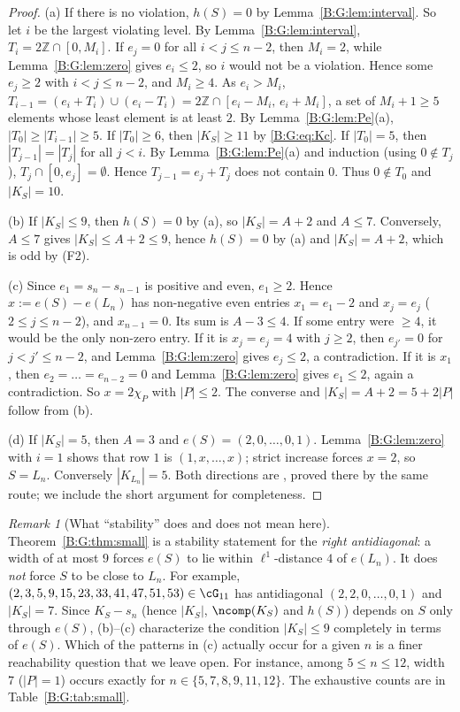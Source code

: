 \documentclass[11pt,a4paper]{article}
\theoremstyle{definition}
\theoremstyle{remark}
\newtheorem{remark}[theorem]{Remark}
\numberwithin{equation}{section}
\begin{document}
\begin{proof}
(a) If there is no violation, $h(S)=0$ by Lemma~\ref{B:G:lem:interval}. So let $i$ be the largest
violating level. By Lemma~\ref{B:G:lem:interval}, $T_i=2\mathbb{Z}\cap[0,M_i]$. If $e_j=0$ for all
$i<j\le n-2$, then $M_i=2$, while Lemma~\ref{B:G:lem:zero} gives $e_i\le2$, so $i$ would not be a
violation. Hence some $e_j\ge2$ with $i<j\le n-2$, and $M_i\ge4$. As $e_i>M_i$,
$T_{i-1}=(e_i+T_i)\cup(e_i-T_i)=2\mathbb{Z}\cap[e_i-M_i,\,e_i+M_i]$, a set of $M_i+1\ge5$ elements
whose least element is at least $2$. By Lemma~\ref{B:G:lem:Pe}(a), $|T_0|\ge|T_{i-1}|\ge5$. If
$|T_0|\ge6$, then $|K_S|\ge11$ by \eqref{B:G:eq:Kc}. If $|T_0|=5$, then $|T_{j-1}|=|T_j|$ for all
$j<i$. By Lemma~\ref{B:G:lem:Pe}(a) and induction (using $0\notin T_j$), $T_j\cap[0,e_j]=\emptyset$.
Hence $T_{j-1}=e_j+T_j$ does not contain $0$. Thus $0\notin T_0$ and $|K_S|=10$.

(b) If $|K_S|\le9$, then $h(S)=0$ by (a), so $|K_S|=A+2$ and $A\le7$. Conversely, $A\le7$ gives
$|K_S|\le A+2\le9$, hence $h(S)=0$ by (a) and $|K_S|=A+2$, which is odd by (F2).

(c) Since $e_1=s_n-s_{n-1}$ is positive and even, $e_1\ge2$. Hence $x:=e(S)-e(L_n)$ has
non-negative even entries $x_1=e_1-2$ and $x_j=e_j$ ($2\le j\le n-2$), and $x_{n-1}=0$. Its sum is
$A-3\le4$. If some entry were $\ge4$, it would be the only non-zero entry. If it is $x_j=e_j=4$
with $j\ge2$, then $e_{j'}=0$ for $j<j'\le n-2$, and Lemma~\ref{B:G:lem:zero} gives $e_j\le2$, a
contradiction. If it is $x_1$, then $e_2=\dots=e_{n-2}=0$ and Lemma~\ref{B:G:lem:zero} gives $e_1\le2$,
again a contradiction. So $x=2\chi_P$ with $|P|\le2$. The converse and $|K_S|=A+2=5+2|P|$ follow
from (b).

(d) If $|K_S|=5$, then $A=3$ and $e(S)=(2,0,\dots,0,1)$. Lemma~\ref{B:G:lem:zero} with $i=1$ shows
that row $1$ is $(1,x,\dots,x)$; strict increase forces $x=2$, so $S=L_n$. Conversely
$|K_{L_n}|=5$. Both directions are \cite[Thm.~25]{R003}, proved there by the same route; we
include the short argument for completeness.
\end{proof}

\begin{remark}[What ``stability'' does and does not mean here]\label{B:G:rem:stability}
Theorem~\ref{B:G:thm:small} is a stability statement for the \emph{right antidiagonal}: a width
of at most $9$ forces $e(S)$ to lie within $\ell^1$-distance $4$ of $e(L_n)$. It does
\emph{not} force $S$ to be close to $L_n$. For example,
$(2,3,5,9,15,23,33,41,47,51,53)\in\cG_{11}$ has antidiagonal $(2,2,0,\dots,0,1)$ and $|K_S|=7$.
Since $K_S-s_n$ (hence $|K_S|$, $\ncomp(K_S)$ and $h(S)$) depends on $S$ only through $e(S)$, (b)--(c) characterize the condition
$|K_S|\le9$ completely in terms of $e(S)$. Which of the patterns in (c) actually occur for a given
$n$ is a finer reachability question that we leave open. For instance, among $5\le n\le12$, width $7$ ($|P|=1$) occurs
exactly for $n\in\{5,7,8,9,11,12\}$. The exhaustive counts are
in Table~\ref{B:G:tab:small}.
\end{remark}
\end{document}
